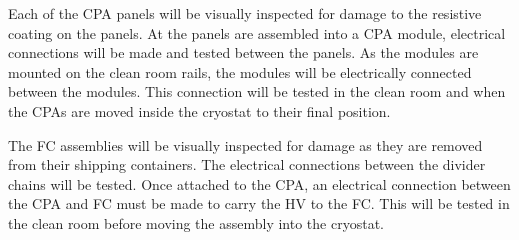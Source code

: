 Each of the CPA panels will be visually inspected for damage to the resistive coating on the panels.  At the panels are assembled into a CPA module, electrical connections will be made and tested between the panels.  As the modules are mounted on the clean room rails, the modules will be electrically connected between the modules.  This connection will be tested in the clean room and when the CPAs are moved inside the cryostat to their final position.  

The FC assemblies will be visually inspected for damage as they are removed from their shipping containers.  The electrical connections between the divider chains will be tested.  Once attached to the CPA, an electrical connection between the CPA and FC must be made to carry the HV to the FC.  This will be tested in the clean room before moving the assembly into the cryostat. 



